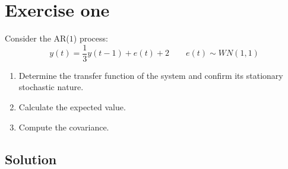 \section{Exercise one}

Consider the AR($1$) process:
\[y(t)=\dfrac{1}{3}y(t-1)+e(t)+2 \qquad e(t)\sim WN(1,1)\]
\begin{enumerate}
    \item Determine the transfer function of the system and confirm its stationary stochastic nature.
    \item Calculate the expected value.
    \item Compute the covariance.
\end{enumerate}

\subsection*{Solution}
